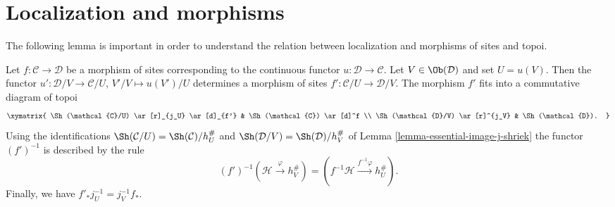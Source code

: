 \section{Localization and morphisms}
\label{section-localize-morphisms}

\noindent
The following lemma is important in order to understand the relation
between localization and morphisms of sites and topoi.

\begin{lemma}
\label{lemma-localize-morphism}
Let $f : \mathcal{C} \to \mathcal{D}$ be a morphism of sites
corresponding to the continuous functor $u : \mathcal{D} \to \mathcal{C}$.
Let $V \in \Ob(\mathcal{D})$ and set $U = u(V)$.
Then the functor $u' : \mathcal{D}/V \to \mathcal{C}/U$,
$V'/V \mapsto u(V')/U$ determines a morphism of sites
$f' : \mathcal{C}/U \to \mathcal{D}/V$.
The morphism $f'$ fits into a commutative diagram of topoi
$$
\xymatrix{
\Sh(\mathcal{C}/U) \ar[r]_{j_U} \ar[d]_{f'} &
\Sh(\mathcal{C}) \ar[d]^f \\
\Sh(\mathcal{D}/V) \ar[r]^{j_V} &
\Sh(\mathcal{D}).
}
$$
Using the identifications
$\Sh(\mathcal{C}/U) = \Sh(\mathcal{C})/h_U^\#$ and
$\Sh(\mathcal{D}/V) = \Sh(\mathcal{D})/h_V^\#$ of
Lemma \ref{lemma-essential-image-j-shriek}
the functor $(f')^{-1}$ is described by the rule
$$
(f')^{-1}(\mathcal{H} \xrightarrow{\varphi} h_V^\#)
=
(f^{-1}\mathcal{H} \xrightarrow{f^{-1}\varphi} h_U^\#).
$$
Finally, we have $f'_*j_U^{-1} = j_V^{-1}f_*$.
\end{lemma}

